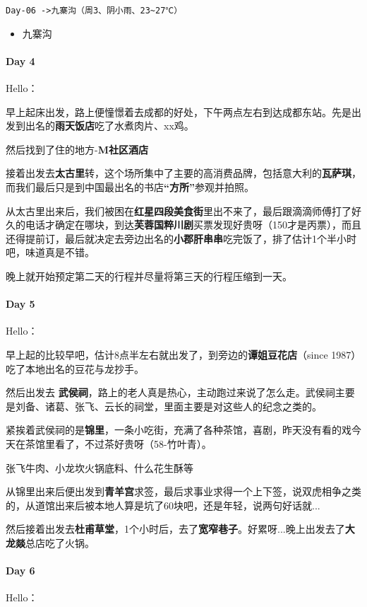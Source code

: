 \documentclass[UTF8,a4paper,8pt]{ctexart}
\begin{document}
		 	\verb|Day-06 ->九寨沟（周3、阴小雨、23~27℃）|
		 	\begin{itemize}[itemindent = 2em]
		 		\item 九寨沟		 	
		 	\end{itemize}
 	 \paragraph{Day 4       \quad     }
	 	 Hello：
	 	 
	 	 早上起床出发，路上便憧憬着去成都的好处，下午两点左右到达成都东站。先是出发到出名的\textbf{雨天饭店}吃了水煮肉片、xx鸡。
	 	 
	 	 然后找到了住的地方-\textbf{M社区酒店}
	 	 
	 	 接着出发去\textbf{太古里}转，这个场所集中了主要的高消费品牌，包括意大利的\textbf{瓦萨琪}，而我们最后只是到中国最出名的书店\textbf{“方所”}参观并拍照。
	 	 
	 	 从太古里出来后，我们被困在\textbf{红星四段美食街}里出不来了，最后跟滴滴师傅打了好久的电话才确定在哪块，到达\textbf{芙蓉国粹川剧}买票发现好贵呀（150才是丙票），而且还得提前订，最后就决定去旁边出名的\textbf{小郡肝串串}吃完饭了，排了估计1个半小时吧，味道真是不错。
	 	 
	 	 晚上就开始预定第二天的行程并尽量将第三天的行程压缩到一天。
	 	 
 	 \paragraph{Day 5       \quad     }
	 	 Hello：
	 	 
	 	 早上起的比较早吧，估计8点半左右就出发了，到旁边的\textbf{谭姐豆花店}（since 1987） 吃了本地出名的豆花与龙抄手。
	 	 
	 	 然后出发去 \textbf{武侯祠}，路上的老人真是热心，主动跑过来说了怎么走。武侯祠主要是刘备、诸葛、张飞、云长的祠堂，里面主要是对这些人的纪念之类的。
	 	 
	 	 紧挨着武侯祠的是\textbf{锦里}，一条小吃街，充满了各种茶馆，喜剧，昨天没有看的戏今天在茶馆里看了，不过茶好贵呀（58-竹叶青）。
	 	 
	 	 张飞牛肉、小龙坎火锅底料、什么花生酥等
	 	 
	 	 从锦里出来后便出发到\textbf{青羊宫}求签，最后求事业求得一个上下签，说双虎相争之类的，从道馆出来后被本地人算是坑了60块吧，还是年轻，说两句好话就...
	 	 
	 	 然后接着出发去\textbf{杜甫草堂}，1个小时后，去了\textbf{宽窄巷子}。好累呀...晚上出发去了\textbf{大龙燚}总店吃了火锅。
 	 \paragraph{Day 6       \quad     }
	 	 Hello：
	 	 
\end{document}
